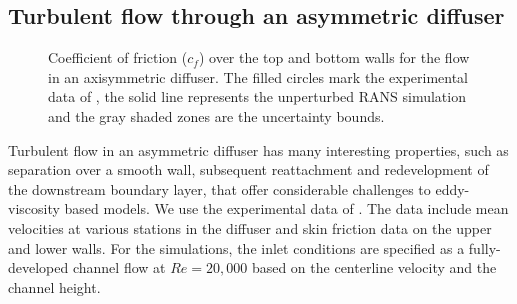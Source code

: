 \subsection{Turbulent flow through an asymmetric diffuser}

\begin{figure}
\centering
{}
\caption{Coefficient of friction ($c_f$) over the top and bottom walls for the flow in an axisymmetric diffuser. The filled circles mark the experimental data of \cite{buice}, the solid line represents the unperturbed RANS simulation and the gray shaded zones are the uncertainty bounds.\label{fig:diffuser_cf}}
\end{figure}

Turbulent flow in an asymmetric diffuser has many interesting properties, such as separation over a smooth wall, subsequent reattachment and redevelopment of the downstream boundary layer, that offer considerable challenges to eddy-viscosity based models. We use the experimental data of \cite{buice}. The data include mean velocities at various stations in the diffuser and skin friction data on the upper and lower walls. For the simulations, the inlet conditions are specified as a fully-developed channel flow at $Re=20,000$ based on the centerline velocity and the channel height. 

